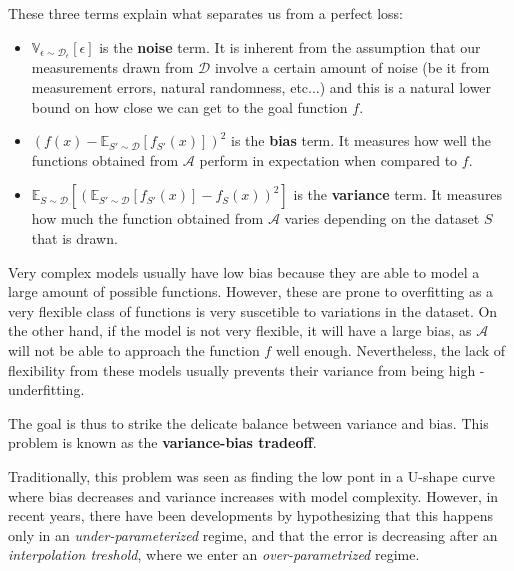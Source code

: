 \documentclass{article}
\newcommand{\E}{\mathbb{E}}
\newcommand{\var}{\mathbb{V}}
\newcommand{\dist}{\mathcal{D}}
\begin{document}
These three terms explain what separates us from a perfect loss:
\begin{itemize}
    \item $\var_{\epsilon \sim \dist_\epsilon} [ \epsilon ]$
	is the \textbf{noise} term. 
	It is inherent from the assumption that our measurements drawn from $\dist$ involve a certain amount of noise (be it from measurement errors, natural randomness, etc...) and this is a natural lower bound on how close we can get to the goal function $f$.
    \item $(f(x) - \E_{S' \sim \dist}[f_{S'}(x)])^2$
	is the \textbf{bias} term.
	It measures how well the functions obtained from $\mathcal{A}$ perform in expectation when compared to $f$.
    \item $\E_{S \sim \dist} \left[ (\E_{S' \sim \dist} [ f_{S'}(x) ] - f_S(x))^2 \right]$
	is the \textbf{variance} term.
	It measures how much the function obtained from $\mathcal{A}$ varies depending on the dataset $S$ that is drawn.
\end{itemize}

Very complex models usually have low bias because they are able to model a large amount of possible functions.
However, these are prone to overfitting as a very flexible class of functions is very suscetible to variations in the dataset.
On the other hand, if the model is not very flexible, it will have a large bias, as $\mathcal{A}$ will not be able to approach the function $f$ well enough.
Nevertheless, the lack of flexibility from these models usually prevents their variance from being high - underfitting.

The goal is thus to strike the delicate balance between variance and bias.
This problem is known as the \textbf{variance-bias tradeoff}.

Traditionally, this problem was seen as finding the low pont in a U-shape curve where bias decreases and variance increases with model complexity.
However, in recent years, there have been developments by hypothesizing that this happens only in an \textit{under-parameterized} regime, and that the error is decreasing after an \textit{interpolation treshold}, where we enter an \textit{over-parametrized} regime.
\end{document}

